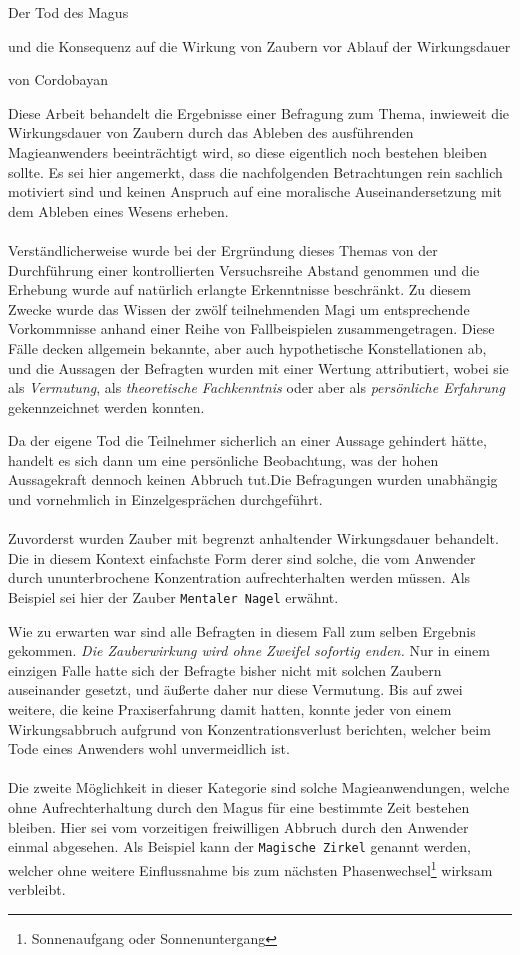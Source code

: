 \documentclass[a5paper,8pt]{book}
\begin{document}
\centerline{\huge Der Tod des Magus} \centerline{und die Konsequenz auf die Wirkung von
Zaubern vor Ablauf der Wirkungsdauer}
\begin{flushright}
von Cordobayan
\end{flushright}
\setlength{\columnseprule}{0.5pt}
\begin{multicols}{2}
Diese Arbeit behandelt die Ergebnisse einer Befragung zum Thema, inwieweit die
Wirkungsdauer von Zaubern durch das Ableben des ausführenden Magieanwenders
beeinträchtigt wird, so diese eigentlich noch bestehen bleiben sollte. Es sei hier
angemerkt, dass die nachfolgenden Betrachtungen rein sachlich motiviert sind und keinen
Anspruch auf eine moralische Auseinandersetzung mit dem Ableben eines Wesens erheben.\\
\\
Verständlicherweise wurde bei der Ergründung dieses Themas von der Durchführung einer
kontrollierten Versuchsreihe Abstand genommen und die Erhebung wurde auf natürlich
erlangte Erkenntnisse beschränkt. Zu diesem Zwecke wurde das Wissen der zwölf
teilnehmenden Magi um entsprechende Vorkommnisse anhand einer Reihe von Fallbeispielen
zusammengetragen. Diese Fälle decken allgemein bekannte, aber auch hypothetische
Konstellationen ab, und die Aussagen der Befragten wurden mit einer Wertung attributiert,
wobei sie als \textsl{Vermutung}, als \textsl{theoretische Fachkenntnis} oder aber als
\textsl{persönliche Erfahrung} gekennzeichnet werden konnten.

Da der eigene Tod die Teilnehmer sicherlich an einer Aussage gehindert hätte, handelt es
sich dann um eine persönliche Beobachtung, was der hohen Aussagekraft dennoch keinen
Abbruch tut.Die Befragungen wurden unabhängig und vornehmlich in Einzelgesprächen durchgeführt.\\
\\
Zuvorderst wurden Zauber mit begrenzt anhaltender Wirkungsdauer behandelt. Die in diesem
Kontext einfachste Form derer sind solche, die vom Anwender durch ununterbrochene
Konzentration aufrechterhalten werden müssen. Als Beispiel sei hier der Zauber
\texttt{Mentaler Nagel} erwähnt.

Wie zu erwarten war sind alle Befragten in diesem Fall zum selben Ergebnis gekommen.
\emph{Die Zauberwirkung wird ohne Zweifel sofortig enden.} Nur in einem einzigen Falle
hatte sich der Befragte bisher nicht mit solchen Zaubern auseinander gesetzt, und äußerte
daher nur diese Vermutung. Bis auf zwei weitere, die keine Praxiserfahrung damit hatten,
konnte jeder von einem Wirkungsabbruch aufgrund von Konzentrationsverlust berichten,
welcher beim Tode eines Anwenders wohl unvermeidlich ist.\\
\\
Die zweite Möglichkeit in dieser Kategorie sind solche Magieanwendungen, welche ohne
Aufrechterhaltung durch den Magus für eine bestimmte Zeit bestehen bleiben. Hier sei vom
vorzeitigen freiwilligen Abbruch durch den Anwender einmal abgesehen. Als Beispiel kann
der \texttt{Magische Zirkel} genannt werden, welcher ohne weitere Einflussnahme bis zum
nächsten Phasenwechsel\footnote{Sonnenaufgang oder Sonnenuntergang} wirksam verbleibt.


\end{multicols}
\end{document}
